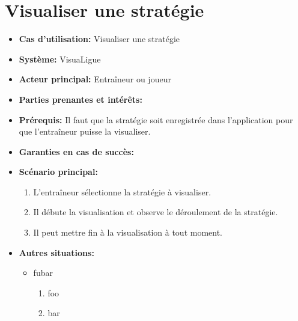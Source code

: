\section{Visualiser une stratégie}
\label{sec:visualiser_une_strategie}
\begin{itemize}
    \item \textbf{Cas d'utilisation:} Visualiser une strat\'egie
    \item \textbf{Syst\`eme:} VisuaLigue
    \item \textbf{Acteur principal:} Entra\^ineur ou joueur
    \item \textbf{Parties prenantes et int\'er\^ets:}
    \item \textbf{Pr\'erequis:} Il faut que la strat\'egie soit enregistr\'ee dans l'application pour que l'entraîneur puisse la visualiser.
    \item \textbf{Garanties en cas de succ\`es:}
    \item \textbf{Sc\'enario principal:}
        \begin{enumerate}
            \item L'entra\^ineur s\'electionne la strat\'egie \`a visualiser.
            \item Il d\'ebute la visualisation et observe le d\'eroulement de la strat\'egie.
            \item Il peut mettre fin \`a la visualisation \`a tout moment.
        \end{enumerate}
    \item \textbf{Autres situations:}
        \begin{itemize}
            \item fubar
                \begin{enumerate}
                    \item foo
                    \item bar
                \end{enumerate}
        \end{itemize}
\end{itemize}



